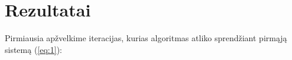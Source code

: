 \documentclass{article}
\begin{document}
\section{Rezultatai}
Pirmiausia apžvelkime iteracijas, kurias algoritmas atliko sprendžiant pirmąją sistemą (\ref{eq:1}):
\begin{table}[H]
    \centering
    \caption{Pirmos sistemos (\ref{eq:1}) simplekso lentelė pirmosios iteracijos pradžioje}
    \label{table:4}
\end{table}
\begin{table}[H]
    \centering
    \caption{Pirmos sistemos (\ref{eq:1}) simplekso lentelė antrosios iteracijos pradžioje}
    \label{table:5}
\end{table}
\begin{table}[H]
    \centering
    \caption{Pirmos sistemos (\ref{eq:1}) simplekso lentelė trečiosios iteracijos pradžioje}
    \label{table:6}
\end{table}
\end{document}
